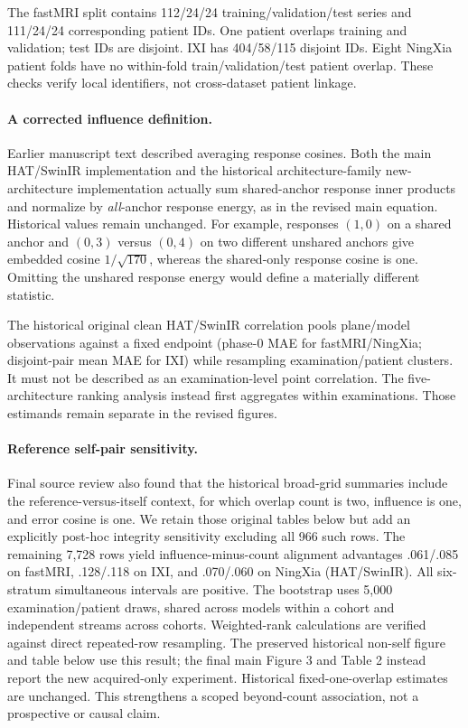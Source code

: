 The fastMRI split contains 112/24/24 training/validation/test series and 111/24/24 corresponding patient IDs. One patient overlaps training and validation; test IDs are disjoint. IXI has 404/58/115 disjoint IDs. Eight NingXia patient folds have no within-fold train/validation/test patient overlap. These checks verify local identifiers, not cross-dataset patient linkage.

\paragraph{A corrected influence definition.}
Earlier manuscript text described averaging response cosines. Both the main HAT/SwinIR implementation and the historical architecture-family new-architecture implementation actually sum shared-anchor response inner products and normalize by \emph{all}-anchor response energy, as in the revised main equation. Historical values remain unchanged. For example, responses $(1,0)$ on a shared anchor and $(0,3)$ versus $(0,4)$ on two different unshared anchors give embedded cosine $1/\sqrt{170}$, whereas the shared-only response cosine is one. Omitting the unshared response energy would define a materially different statistic.

The historical original clean HAT/SwinIR correlation pools plane/model observations against a fixed endpoint (phase-0 MAE for fastMRI/NingXia; disjoint-pair mean MAE for IXI) while resampling examination/patient clusters. It must not be described as an examination-level point correlation. The five-architecture ranking analysis instead first aggregates within examinations. Those estimands remain separate in the revised figures.

\paragraph{Reference self-pair sensitivity.}
Final source review also found that the historical broad-grid summaries include the reference-versus-itself context, for which overlap count is two, influence is one, and error cosine is one. We retain those original tables below but add an explicitly post-hoc integrity sensitivity excluding all 966 such rows. The remaining 7,728 rows yield influence-minus-count alignment advantages .061/.085 on fastMRI, .128/.118 on IXI, and .070/.060 on NingXia (HAT/SwinIR). All six-stratum simultaneous intervals are positive. The bootstrap uses 5,000 examination/patient draws, shared across models within a cohort and independent streams across cohorts. Weighted-rank calculations are verified against direct repeated-row resampling. The preserved historical non-self figure and table below use this result; the final main Figure 3 and Table 2 instead report the new acquired-only experiment. Historical fixed-one-overlap estimates are unchanged. This strengthens a scoped beyond-count association, not a prospective or causal claim.

